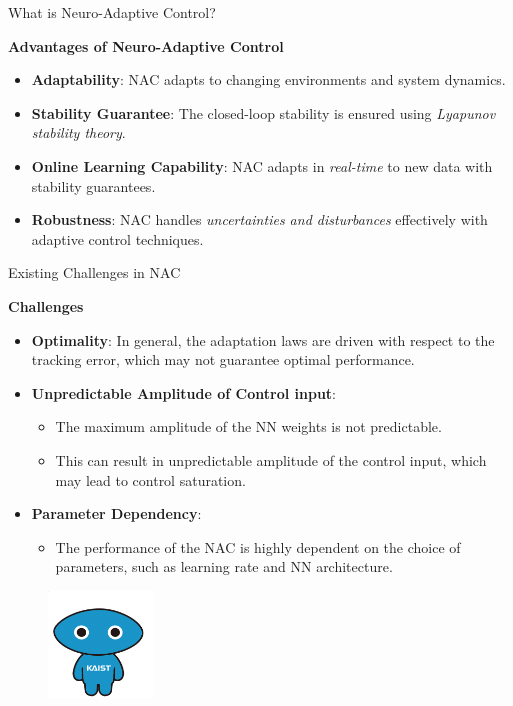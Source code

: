 \documentclass[8pt, aspectratio=169]{beamer}
\begin{document}
\begin{frame}{\insertsubsectionhead}{What is Neuro-Adaptive Control?}

  \textbf{Advantages of Neuro-Adaptive Control}
  \small{
    \begin{itemize}
      \item \textbf{Adaptability}: NAC adapts to changing environments and system dynamics.
      \item \textbf{Stability Guarantee}: The closed-loop stability is ensured using \textit{Lyapunov stability theory}.
      \item \textbf{Online Learning Capability}: NAC adapts in \textit{real-time} to new data with stability guarantees.
      \item \textbf{Robustness}: NAC handles \textit{uncertainties and disturbances} effectively with adaptive control techniques.
    \end{itemize}
  }
  
\end{frame}

\begin{frame}{\insertsubsectionhead}{Existing Challenges in NAC}
  
  \textbf{Challenges}
  \small{
    \begin{itemize}
      \item \textbf{Optimality}: In general, the adaptation laws are driven with respect to the tracking error, which may not guarantee optimal performance.
      \item \textbf{Unpredictable Amplitude of Control input}: 
        \begin{itemize}
          \item The maximum amplitude of the NN weights is not predictable.
          \item This can result in unpredictable amplitude of the control input, which may lead to control saturation.
        \end{itemize}
      \item \textbf{Parameter Dependency}: 
      \begin{itemize}
        \item The performance of the NAC is highly dependent on the choice of parameters, such as learning rate and NN architecture.
      \end{itemize}
    \end{itemize}
  }

  \begin{figure}
    \includegraphics[width=0.25\textwidth]{figures/KAIST-hi.png}
  \end{figure}

\end{frame}
\end{document}
